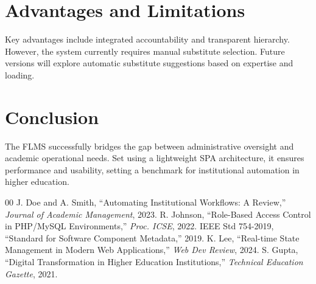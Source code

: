 \documentclass[conference]{IEEEtran}
\begin{document}
\section{Advantages and Limitations}
Key advantages include integrated accountability and transparent hierarchy. However, the system currently requires manual substitute selection. Future versions will explore automatic substitute suggestions based on expertise and loading.

\section{Conclusion}
The FLMS successfully bridges the gap between administrative oversight and academic operational needs. Set using a lightweight SPA architecture, it ensures performance and usability, setting a benchmark for institutional automation in higher education.

\begin{thebibliography}{00}
 J. Doe and A. Smith, ``Automating Institutional Workflows: A Review,'' \textit{Journal of Academic Management}, 2023.
 R. Johnson, ``Role-Based Access Control in PHP/MySQL Environments,'' \textit{Proc. ICSE}, 2022.
 IEEE Std 754-2019, ``Standard for Software Component Metadata,'' 2019.
 K. Lee, ``Real-time State Management in Modern Web Applications,'' \textit{Web Dev Review}, 2024.
 S. Gupta, ``Digital Transformation in Higher Education Institutions,'' \textit{Technical Education Gazette}, 2021.
\end{thebibliography}
\end{document}
